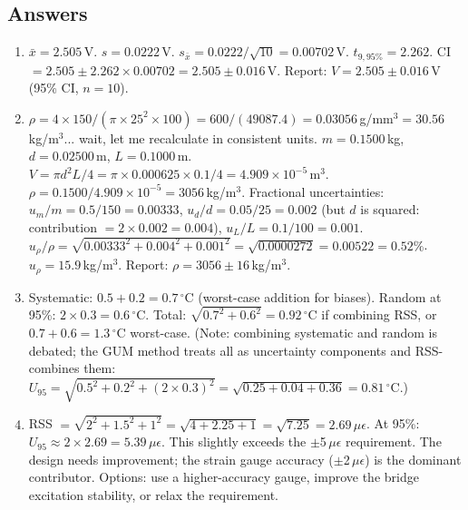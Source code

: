 \documentclass[11pt,letterpaper,twoside,openany]{book}
\newcommand{\degC}{\ensuremath{{}^{\circ}\text{C}}}
\begin{document}
\subsection{Answers}
\begin{enumerate}[leftmargin=1.5em]
\item $\bar{x} = 2.505$\,V. $s = 0.0222$\,V. $s_{\bar{x}} = 0.0222/\sqrt{10} = 0.00702$\,V. $t_{9,95\%} = 2.262$. CI $= 2.505 \pm 2.262 \times 0.00702 = 2.505 \pm 0.016$\,V. Report: $V = 2.505 \pm 0.016$\,V (95\% CI, $n = 10$).
\item $\rho = 4 \times 150 / (\pi \times 25^2 \times 100) = 600 / (49087.4) = 0.03056$\,g/mm$^3 = 30.56$\,kg/m$^3$... wait, let me recalculate in consistent units. $m = 0.1500$\,kg, $d = 0.02500$\,m, $L = 0.1000$\,m. $V = \pi d^2 L / 4 = \pi \times 0.000625 \times 0.1 / 4 = 4.909 \times 10^{-5}$\,m$^3$. $\rho = 0.1500 / 4.909 \times 10^{-5} = 3056$\,kg/m$^3$. Fractional uncertainties: $u_m/m = 0.5/150 = 0.00333$, $u_d/d = 0.05/25 = 0.002$ (but $d$ is squared: contribution $= 2 \times 0.002 = 0.004$), $u_L/L = 0.1/100 = 0.001$. $u_\rho / \rho = \sqrt{0.00333^2 + 0.004^2 + 0.001^2} = \sqrt{0.0000272} = 0.00522 = 0.52\%$. $u_\rho = 15.9$\,kg/m$^3$. Report: $\rho = 3056 \pm 16$\,kg/m$^3$.
\item Systematic: $0.5 + 0.2 = 0.7$\,\degC{} (worst-case addition for biases). Random at 95\%: $2 \times 0.3 = 0.6$\,\degC{}. Total: $\sqrt{0.7^2 + 0.6^2} = 0.92$\,\degC{} if combining RSS, or $0.7 + 0.6 = 1.3$\,\degC{} worst-case. (Note: combining systematic and random is debated; the GUM method treats all as uncertainty components and RSS-combines them: $U_{95} = \sqrt{0.5^2 + 0.2^2 + (2 \times 0.3)^2} = \sqrt{0.25 + 0.04 + 0.36} = 0.81$\,\degC{}.)
\item RSS $= \sqrt{2^2 + 1.5^2 + 1^2} = \sqrt{4 + 2.25 + 1} = \sqrt{7.25} = 2.69\,\mu\epsilon$. At 95\%: $U_{95} \approx 2 \times 2.69 = 5.39\,\mu\epsilon$. This slightly exceeds the $\pm$5\,$\mu\epsilon$ requirement. The design needs improvement; the strain gauge accuracy ($\pm$2\,$\mu\epsilon$) is the dominant contributor. Options: use a higher-accuracy gauge, improve the bridge excitation stability, or relax the requirement.
\end{enumerate}

\end{document}
